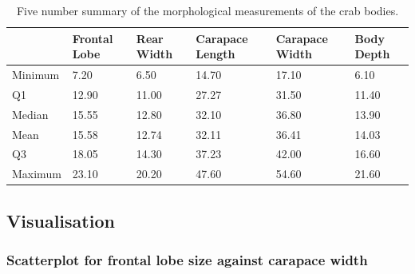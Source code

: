 \documentclass[
]{article}
\begin{document}
\begin{table}[!h]

\caption{\label{tab:summary}Five number summary of the morphological measurements of the crab bodies.}
\centering
\begin{tabular}[t]{l|l|l|l|l|l}
\hline
  & Frontal Lobe & Rear Width & Carapace Length & Carapace Width & Body Depth\\
\hline
Minimum & 7.20 & 6.50 & 14.70 & 17.10 & 6.10\\
\hline
Q1 & 12.90 & 11.00 & 27.27 & 31.50 & 11.40\\
\hline
Median & 15.55 & 12.80 & 32.10 & 36.80 & 13.90\\
\hline
Mean & 15.58 & 12.74 & 32.11 & 36.41 & 14.03\\
\hline
Q3 & 18.05 & 14.30 & 37.23 & 42.00 & 16.60\\
\hline
Maximum & 23.10 & 20.20 & 47.60 & 54.60 & 21.60\\
\hline
\end{tabular}
\end{table}

\newpage

\hypertarget{visualisation}{%
\subsection{Visualisation}\label{visualisation}}

\hypertarget{scatterplot-for-frontal-lobe-size-against-carapace-width}{%
\subsubsection{Scatterplot for frontal lobe size against carapace
width}\label{scatterplot-for-frontal-lobe-size-against-carapace-width}}
\end{document}

